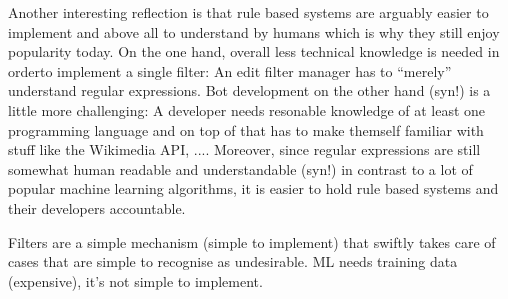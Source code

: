Another interesting reflection is that rule based systems are arguably easier to implement and above all to understand by humans which is why they still enjoy popularity today.
On the one hand, overall less technical knowledge is needed in orderto implement a single filter:
An edit filter manager has to ``merely'' understand regular expressions.
Bot development on the other hand (syn!) is a little more challenging:
A developer needs resonable knowledge of at least one programming language and on top of that has to make themself familiar with stuff like the Wikimedia API, ....
Moreover, since regular expressions are still somewhat human readable and understandable (syn!) in contrast to a lot of popular machine learning algorithms, it is easier to hold rule based systems and their developers accountable.

Filters are a simple mechanism (simple to implement) that swiftly takes care of cases that are simple to recognise as undesirable.
ML needs training data (expensive), it's not simple to implement.


\begin{comment}
maybe it's a historical phenomenon (in many regards):
* perhaps there were differences that are not essential anymore, such as:
  * on which infrastructure does it run (part of the core software vs own computers of the bot operators)
  * filters are triggered *before* an edit is even published, whereas bots (and tools) can revert an edit post factum. Is this really an important difference in times when bots need a couple of seconds to revert an edit?
* perhaps the extension was implemented because someone was capable of implementing and working well with this type of systems so they just went and did it (do-ocracy; Wikipedia as a collaborative volunteer project);
* perhaps it still exists in times of fancier machine learning based tools (or bots) because rule-based systems are more transparent/easily understandable for humans and writing a regex is simpler than coding a bot.
* hypothesis: it is easier to set up a filter than program a bot. Setting up a filter requires "only" understanding of regular expressions. Programming a bot requires knowledge of a programming language and understanding of the API.
\end{comment}

\begin{comment}
Interestingly, there was a guideline somewhere stating that no trivial formatting mistakes should trip filters\cite{Wikipedia:EditFilterRequested}
I actually think, a bot fixing this would be more appropriate.
## Open questions

If discerning motivation is difficult, and, we want to achieve different results, depending on the motivation, that lead us to the question whether filtering is the proper mechanism to deal with disruptive edits.

\end{comment}

